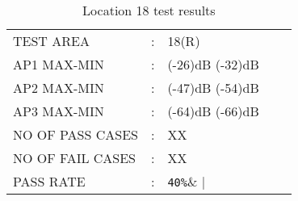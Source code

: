 \begin{table}[H]
	\centering
	\label{LOCATION EIGHTEEN TEST}
	\begin{tabular}{lllll}
		TEST AREA& :&  18(R)&    \\
		AP1 MAX-MIN& :& (-26)dB (-32)dB&  \\
		AP2 MAX-MIN& :& (-47)dB (-54)dB&   \\
		AP3 MAX-MIN& :& (-64)dB (-66)dB&   \\
		NO OF PASS CASES& :& XX&  \\
		NO OF FAIL CASES& :& XX&   \\
		PASS RATE& :& \verb|40%|&   
	\end{tabular}
	\caption{Location 18 test results}
\end{table}